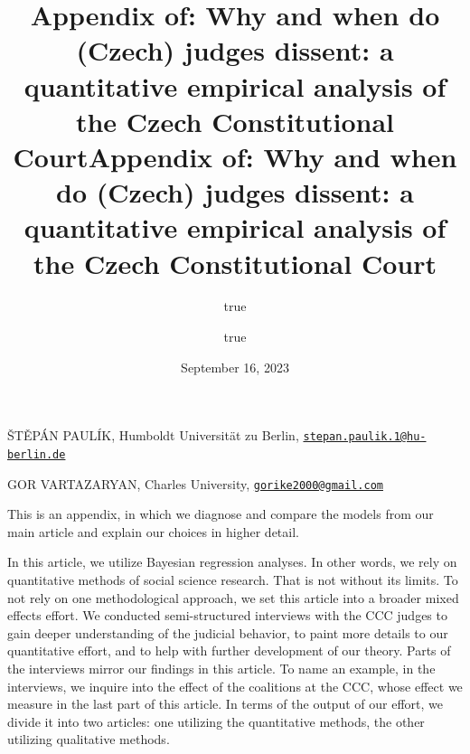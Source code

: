 \documentclass[
  11pt,
]{article}
\title{Appendix of: Why and when do (Czech) judges dissent: a
quantitative empirical analysis of the Czech Constitutional Court}
\author{true \and true}
\date{September 16, 2023}
\title{Appendix of: Why and when do (Czech) judges dissent: a
quantitative empirical analysis of the Czech Constitutional Court }
\date{}
\begin{document}



{%
\setlength{\parindent}{0pt}
\thispagestyle{plain}
{%
\maketitle  %

}




{
   \vskip 13.5pt\relax \normalsize\fontsize{11}{12}
   \MakeUppercase{Štěpán Paulík}, \small{Humboldt Universität zu Berlin,
\href{mailto:stepan.paulik.1@hu-berlin.de}{\nolinkurl{stepan.paulik.1@hu-berlin.de}}}   \par \vskip -3.5pt \MakeUppercase{Gor
Vartazaryan}, \small{Charles University,
\href{mailto:gorike2000@gmail.com}{\nolinkurl{gorike2000@gmail.com}}}   

}

}






\vskip -8.5pt

{
\hypersetup{linkcolor=black}
\setcounter{tocdepth}{2}
\tableofcontents
}


{
\setcounter{tocdepth}{2}
\tableofcontents
}

\setlength{\parindent}{16pt}
\setlength{\parskip}{0pt}

\doublespacing
\vspace{30pt}

This is an appendix, in which we diagnose and compare the models from
our main article and explain our choices in higher detail.

In this article, we utilize Bayesian regression analyses. In other
words, we rely on quantitative methods of social science research. That
is not without its limits. To not rely on one methodological approach,
we set this article into a broader mixed effects effort. We conducted
semi-structured interviews with the CCC judges to gain deeper
understanding of the judicial behavior, to paint more details to our
quantitative effort, and to help with further development of our theory.
Parts of the interviews mirror our findings in this article. To name an
example, in the interviews, we inquire into the effect of the coalitions
at the CCC, whose effect we measure in the last part of this article. In
terms of the output of our effort, we divide it into two articles: one
utilizing the quantitative methods, the other utilizing qualitative
methods.
\end{document}
